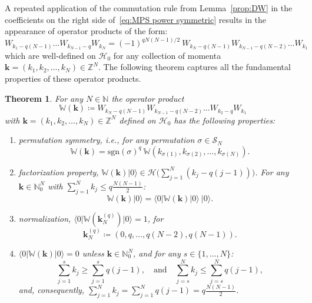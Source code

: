 \documentclass[letterpaper, DIV=17]{scrartcl}
\newtheorem{theorem}{Theorem}[section]  %
\numberwithin{equation}{section}
\theoremstyle{definition}
\begin{document}
A repeated application of  the commutation rule from Lemma~\ref{prop:DW} in the coefficients on the right side of~\eqref{eq:MPS power symmetric} results in the appearance of operator products of the form: 
		\begin{equation}\label{eq:Wproductchange}
		W_{k_1-q(N-1) } \dots W_{k_{N-1}-q} W_{k_N} = (-1)^{qN(N-1)/2} \ W_{k_N-q(N-1)} W_{k_{N-1}-q(N-2)} \dots W_{k_1} 	
		\end{equation}
		which are well-defined on $ \mathcal{H}_0 $ for any collection of momenta $ \mathbf{k} = (k_1,k_2, \dots, k_N) \in \mathbb{Z}^N $.
The following theorem captures all the fundamental properties of these operator products. 
%
\begin{theorem}  \label{vanishing condition}
For any $ N \in \mathbb{N} $ the operator product 
\begin{equation} \label{def mathcal W}
			 \mathbb{W}(\mathbf{k}) \coloneqq W_{k_N-q(N-1)} W_{k_{N-1}-q(N-2)} \dots W_{k_2 - q} W_{k_1} 
			 \end{equation}
with $ \mathbf{k} = (k_1,k_2, \dots, k_N) \in \mathbb{Z}^N $ defined on $ \mathcal{H}_0 $ has the following properties: 
\begin{enumerate}
\item permutation symmetry, i.e., for any permutation $ \sigma \in \mathcal{S}_N $
\begin{equation}\label{eq:permutations} 
 \mathbb{W}(\mathbf{k}) = \mathrm{sgn}(\sigma)^q  \  \mathbb{W}(k_{\sigma(1)},k_{\sigma(2)}, \dots, k_{\sigma(N)})  .
\end{equation}
\item factorization property, $  \displaystyle \mathbb{W}(\mathbf{k}) \vert 0 \rangle \in \mathcal{H}\big(\sum_{j=1}^N (k_j - q(j-1))\big) $. 
For any $  \mathbf{k}  \in  \mathbb{N}_0^N  $ with $\displaystyle \sum_{j=1}^N k_j \leq  q \frac{N(N-1)}{2} $:
\begin{equation}\label{eq:partition}
 \mathbb{W}(\mathbf{k}) \vert 0 \rangle = 	\langle 0 \vert \mathbb{W}(\mathbf{k}) \vert 0 \rangle \ \vert 0 \rangle   .
\end{equation}
\item normalization, $  \langle 0 \vert \mathbb{W}\left( \mathbf{k}^{(q)}_N\right) \vert 0 \rangle = 1 $,  for 
\begin{equation}\label{eq:rootp}
  \mathbf{k}^{(q)}_N \coloneqq \left( 0, q , \dots , q (N-2) , q (N-1) \right) . 
\end{equation}
\item\label{item:partitions} $  \displaystyle  \langle 0 \vert \mathbb{W}(\mathbf{k}) \vert 0 \rangle =0 $ unless  $  \mathbf{k}  \in  \mathbb{N}_0^N  $, and for any $ s \in \{1 , \dots , N\} $:
\begin{equation} \label{eq:domination}
	\sum_{j=1}^s k_j \geq  \sum_{j=1}^s q(j-1) , \quad\mbox{and}\quad  \sum_{j=s}^N k_j \leq  \sum_{j=s}^N q(j-1) ,
\end{equation}
and, consequently, $  \displaystyle  \sum_{j=1}^N k_j =  \sum_{j=1}^N q(j-1) = q \frac{N(N-1)}{2} $.

\end{enumerate}
\end{theorem}
\end{document}
